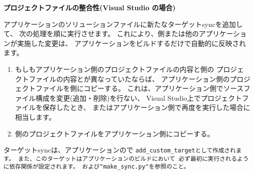 \medskip
\bf{プロジェクトファイルの整合性(Visual Studio の場合)}
\begin{narrow}
	アプリケーションのソリューションファイルに新たなターゲットsyncを追加して、
	次の処理を順に実行させます。
	これにより、\SprLib 側または他のアプリケーションが実施した変更は、
	アプリケーションをビルドするだけで自動的に反映されます。

	\begin{enumerate}
	  \item	もしもアプリケーション側のプロジェクトファイルの内容と\SprLib 側の
		プロジェクトファイルの内容とが異なっていたならば、
		アプリケーション側のプロジェクトファイルを\SprLib 側にコピーする。
		これは、アプリケーション側でソースファイル構成を変更(追加・削除)を行ない、
		Visual Studio上でプロジェクトファイルを保存したとき、
		またはアプリケーション側で再度\cmake を実行した場合に相当します。

	  \item	\SprLib 側のプロジェクトファイルをアプリケーション側にコピーする。
	\end{enumerate}

	ターゲットsyncは、アプリケーションの\QCMakeLists{}で
	\tt{add\_custom\_target}として作成されます。
	また、このターゲットはアプリケーションのビルドにおいて
	必ず最初に実行されるように依存関係が設定されます。
	および\tt{"make\_sync.py"}を参照のこと。

	\medskip
\end{narrow}

